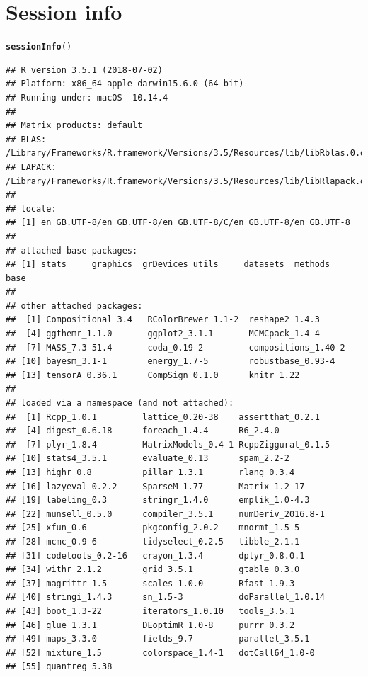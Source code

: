 \documentclass{article}\usepackage[]{graphicx}\usepackage[]{color}
\makeatletter
\newcommand{\hlstd}[1]{\textcolor[rgb]{0.345,0.345,0.345}{#1}}%
\newcommand{\hlkwd}[1]{\textcolor[rgb]{0.737,0.353,0.396}{\textbf{#1}}}%
\newenvironment{kframe}{%
 \def\at@end@of@kframe{}%
 \ifinner\ifhmode%
  \def\at@end@of@kframe{\end{minipage}}%
  \begin{minipage}{\columnwidth}%
 \fi\fi%
 \def\FrameCommand##1{\hskip\@totalleftmargin \hskip-\fboxsep
 \colorbox{shadecolor}{##1}\hskip-\fboxsep
     \hskip-\linewidth \hskip-\@totalleftmargin \hskip\columnwidth}%
 \MakeFramed {\advance\hsize-\width
   \@totalleftmargin\z@ \linewidth\hsize
   \@setminipage}}%
 {\par\unskip\endMakeFramed%
 \at@end@of@kframe}
\newenvironment{knitrout}{}{} %
\makeatother
\begin{document}
\section{Session info}
\begin{knitrout}
\color{fgcolor}\begin{kframe}
\begin{alltt}
  \hlkwd{sessionInfo}\hlstd{()}
\end{alltt}
\begin{verbatim}
## R version 3.5.1 (2018-07-02)
## Platform: x86_64-apple-darwin15.6.0 (64-bit)
## Running under: macOS  10.14.4
## 
## Matrix products: default
## BLAS: /Library/Frameworks/R.framework/Versions/3.5/Resources/lib/libRblas.0.dylib
## LAPACK: /Library/Frameworks/R.framework/Versions/3.5/Resources/lib/libRlapack.dylib
## 
## locale:
## [1] en_GB.UTF-8/en_GB.UTF-8/en_GB.UTF-8/C/en_GB.UTF-8/en_GB.UTF-8
## 
## attached base packages:
## [1] stats     graphics  grDevices utils     datasets  methods   base     
## 
## other attached packages:
##  [1] Compositional_3.4   RColorBrewer_1.1-2  reshape2_1.4.3     
##  [4] ggthemr_1.1.0       ggplot2_3.1.1       MCMCpack_1.4-4     
##  [7] MASS_7.3-51.4       coda_0.19-2         compositions_1.40-2
## [10] bayesm_3.1-1        energy_1.7-5        robustbase_0.93-4  
## [13] tensorA_0.36.1      CompSign_0.1.0      knitr_1.22         
## 
## loaded via a namespace (and not attached):
##  [1] Rcpp_1.0.1         lattice_0.20-38    assertthat_0.2.1  
##  [4] digest_0.6.18      foreach_1.4.4      R6_2.4.0          
##  [7] plyr_1.8.4         MatrixModels_0.4-1 RcppZiggurat_0.1.5
## [10] stats4_3.5.1       evaluate_0.13      spam_2.2-2        
## [13] highr_0.8          pillar_1.3.1       rlang_0.3.4       
## [16] lazyeval_0.2.2     SparseM_1.77       Matrix_1.2-17     
## [19] labeling_0.3       stringr_1.4.0      emplik_1.0-4.3    
## [22] munsell_0.5.0      compiler_3.5.1     numDeriv_2016.8-1 
## [25] xfun_0.6           pkgconfig_2.0.2    mnormt_1.5-5      
## [28] mcmc_0.9-6         tidyselect_0.2.5   tibble_2.1.1      
## [31] codetools_0.2-16   crayon_1.3.4       dplyr_0.8.0.1     
## [34] withr_2.1.2        grid_3.5.1         gtable_0.3.0      
## [37] magrittr_1.5       scales_1.0.0       Rfast_1.9.3       
## [40] stringi_1.4.3      sn_1.5-3           doParallel_1.0.14 
## [43] boot_1.3-22        iterators_1.0.10   tools_3.5.1       
## [46] glue_1.3.1         DEoptimR_1.0-8     purrr_0.3.2       
## [49] maps_3.3.0         fields_9.7         parallel_3.5.1    
## [52] mixture_1.5        colorspace_1.4-1   dotCall64_1.0-0   
## [55] quantreg_5.38
\end{verbatim}
\end{kframe}
\end{knitrout}
\end{document}
